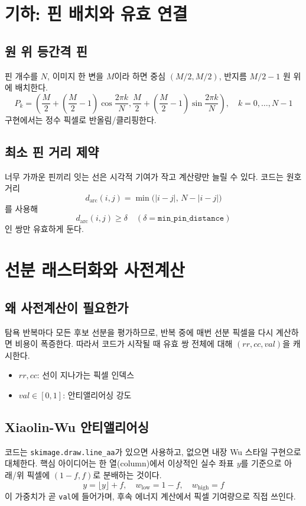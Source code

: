 \documentclass[11pt,a4paper]{article}
\begin{document}
\section{기하: 핀 배치와 유효 연결}
\subsection{원 위 등간격 핀}
핀 개수를 \(N\), 이미지 한 변을 \(M\)이라 하면
중심 \((M/2, M/2)\), 반지름 \(M/2-1\) 원 위에 배치한다.
\begin{equation}
P_k=\left(\frac{M}{2}+\left(\frac{M}{2}-1\right)\cos\frac{2\pi k}{N},
\frac{M}{2}+\left(\frac{M}{2}-1\right)\sin\frac{2\pi k}{N}\right),\quad k=0,\dots,N-1
\end{equation}
구현에서는 정수 픽셀로 반올림/클리핑한다.

\subsection{최소 핀 거리 제약}
너무 가까운 핀끼리 잇는 선은 시각적 기여가 작고 계산량만 늘릴 수 있다.
코드는 원호 거리
\begin{equation}
d_{\mathrm{arc}}(i,j)=\min\bigl(|i-j|,\,N-|i-j|\bigr)
\end{equation}
를 사용해
\begin{equation}
d_{\mathrm{arc}}(i,j)\ge \delta\quad (\delta=\texttt{min\_pin\_distance})
\end{equation}
인 쌍만 유효하게 둔다.

\section{선분 래스터화와 사전계산}
\subsection{왜 사전계산이 필요한가}
탐욕 반복마다 모든 후보 선분을 평가하므로,
반복 중에 매번 선분 픽셀을 다시 계산하면 비용이 폭증한다.
따라서 코드가 시작될 때 유효 쌍 전체에 대해
\((rr,cc,val)\)을 캐시한다.
\begin{itemize}
  \item \(rr,cc\): 선이 지나가는 픽셀 인덱스
  \item \(val\in[0,1]\): 안티앨리어싱 강도
\end{itemize}

\subsection{Xiaolin-Wu 안티앨리어싱}
코드는 \texttt{skimage.draw.line\_aa}가 있으면 사용하고,
없으면 내장 Wu 스타일 구현으로 대체한다.
핵심 아이디어는 한 열(column)에서 이상적인 실수 좌표 \(y\)를 기준으로
아래/위 픽셀에 \((1-f, f)\)로 분배하는 것이다.
\begin{equation}
y=\lfloor y\rfloor+f,\quad
w_{\text{low}}=1-f,\quad w_{\text{high}}=f
\end{equation}
이 가중치가 곧 \texttt{val}에 들어가며,
후속 에너지 계산에서 픽셀 기여량으로 직접 쓰인다.
\end{document}
